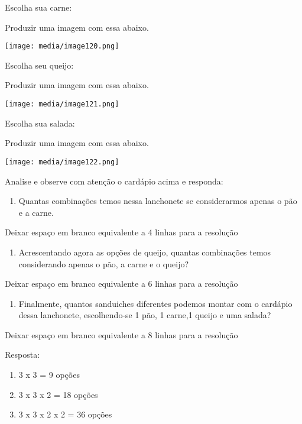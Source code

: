 Escolha sua carne:

Produzir uma imagem com essa abaixo.

\texttt{[image: media/image120.png]}

Escolha seu queijo:

Produzir uma imagem com essa abaixo.

\texttt{[image: media/image121.png]}

Escolha sua salada:

Produzir uma imagem com essa abaixo.

\texttt{[image: media/image122.png]}

Analise e observe com atenção o cardápio acima e responda:

\begin{enumerate}
\def\labelenumi{\alph{enumi})}
\item
  Quantas combinações temos nessa lanchonete se considerarmos apenas o
  pão e a carne.
\end{enumerate}

Deixar espaço em branco equivalente a 4 linhas para a resolução

\begin{enumerate}
\def\labelenumi{\alph{enumi})}
\item
  Acrescentando agora as opções de queijo, quantas combinações temos
  considerando apenas o pão, a carne e o queijo?
\end{enumerate}

Deixar espaço em branco equivalente a 6 linhas para a resolução

\begin{enumerate}
\def\labelenumi{\alph{enumi})}
\item
  Finalmente, quantos sanduiches diferentes podemos montar com o
  cardápio dessa lanchonete, escolhendo-se 1 pão, 1 carne,1 queijo e uma
  salada?
\end{enumerate}

Deixar espaço em branco equivalente a 8 linhas para a resolução

Resposta:

\begin{enumerate}
\def\labelenumi{\alph{enumi})}
\item
  3 x 3 = 9 opções
\item
  3 x 3 x 2 = 18 opções
\item
  3 x 3 x 2 x 2 = 36 opções
\end{enumerate}

